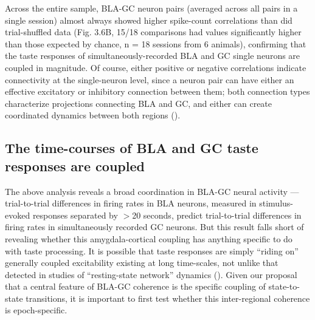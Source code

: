 \begin{refsection}
Across the entire sample, BLA-GC neuron pairs (averaged across all pairs in a single session) almost always showed higher spike-count correlations than did trial-shuffled data (Fig. 3.6B, 15/18 comparisons had values significantly higher than those expected by chance, n = 18 sessions from 6 animals), confirming that the taste responses of simultaneously-recorded BLA and GC single neurons are coupled in magnitude. Of course, either positive or negative correlations indicate connectivity at the single-neuron level, since a neuron pair can have either an effective excitatory or inhibitory connection between them; both connection types characterize projections connecting BLA and GC, and either can create coordinated dynamics between both regions (\cite{haley2016a,fu2020a}).

\subsection{The time-courses of BLA and GC taste responses are coupled}
The above analysis reveals a broad coordination in BLA-GC neural activity --- trial-to-trial differences in firing rates in BLA neurons, measured in stimulus-evoked responses separated by \(>\)20 seconds, predict trial-to-trial differences in firing rates in simultaneously recorded GC neurons. But this result falls short of revealing whether this amygdala-cortical coupling has anything specific to do with taste processing. It is possible that taste responses are simply “riding on” generally coupled excitability existing at long time-scales, not unlike that detected in studies of “resting-state network” dynamics (\cite{raichle2015a,seitzman2019a}). Given our proposal that a central feature of BLA-GC coherence is the specific coupling of state-to-state transitions, it is important to first test whether this inter-regional coherence is epoch-specific.


\end{refsection}
